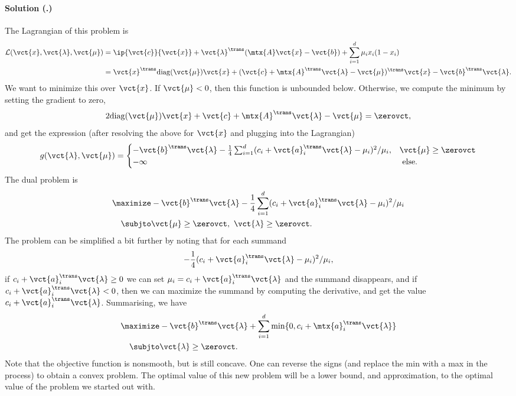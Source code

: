 \documentclass{article}
\newcounter{problemSheetNumber}
\newcounter{problems}
\renewcommand{\solution}[1]{\paragraph{Solution (\theproblemSheetNumber.\theproblems)}\addtocounter{problems}{1}\label{#1}}
\begin{document}
\solution{pr:3} The Lagrangian of this problem is
\begin{align*}
 \mathcal{L}(\vct{x},\vct{\lambda},\vct{\mu}) &= \ip{\vct{c}}{\vct{x}}+\vct{\lambda}^{\trans}(\mtx{A}\vct{x}-\vct{b}) + \sum_{i=1}^d \mu_i x_i(1-x_i)\\
 &= \vct{x}^{\trans}\mathrm{diag}(\vct{\mu})\vct{x}+(\vct{c}+\mtx{A}^{\trans}\vct{\lambda}-\vct{\mu})^{\trans}\vct{x}-\vct{b}^{\trans}\vct{\lambda}.
\end{align*}
We want to minimize this over $\vct{x}$. If $\vct{\mu}<0$, then this function is unbounded below. Otherwise, we compute the minimum by setting the gradient to zero,
\begin{equation*}
 2\mathrm{diag}(\vct{\mu})\vct{x}+\vct{c}+\mtx{A}^{\trans}\vct{\lambda}-\vct{\mu} = \zerovct,
\end{equation*}
and get the expression (after resolving the above for $\vct{x}$ and plugging into the Lagrangian)
\begin{equation*}
 g(\vct{\lambda},\vct{\mu}) = \begin{cases}
                               -\vct{b}^{\trans}\vct{\lambda}-\frac{1}{4}\sum_{i=1}^d (c_i+\vct{a}_i^{\trans}\vct{\lambda}-\mu_i)^2/\mu_i, & \vct{\mu}\geq \zerovct\\
                               -\infty & \text{ else.}
                              \end{cases}
\end{equation*}
The dual problem is
\begin{align*}
 \maximize & -\vct{b}^{\trans}\vct{\lambda}-\frac{1}{4}\sum_{i=1}^d (c_i+\vct{a}_i^{\trans}\vct{\lambda}-\mu_i)^2/\mu_i\\
 \subjto & \vct{\mu}\geq \zerovct, \ \vct{\lambda}\geq \zerovct.
\end{align*}
The problem can be simplified a bit further by noting that for each summand
\begin{equation*}
 -\frac{1}{4}(c_i+\vct{a}_i^{\trans}\vct{\lambda}-\mu_i)^2/\mu_i,
\end{equation*}
if $c_i+\vct{a}_i^{\trans}\vct{\lambda}\geq 0$ we can set $\mu_i=c_i+\vct{a}_i^{\trans}\vct{\lambda}$ and the summand disappears, and if $c_i+\vct{a}_i^{\trans}\vct{\lambda}<0$, then we can maximize the summand by computing the derivative, and get the value $c_i+\vct{a}_i^{\trans}\vct{\lambda}$. Summarising, we have
\begin{align*}
 \maximize & -\vct{b}^{\trans}\vct{\lambda}+\sum_{i=1}^d \min\{0,c_i+\mtx{a}_i^{\trans}\vct{\lambda}\}\\
 \subjto & \vct{\lambda}\geq \zerovct.
\end{align*}
Note that the objective function is nonsmooth, but is still concave. One can reverse the signs (and replace the min with a max in the process) to obtain a convex problem. The optimal value of this new problem will be a lower bound, and approximation, to the optimal value of the problem we started out with.
\end{document}
